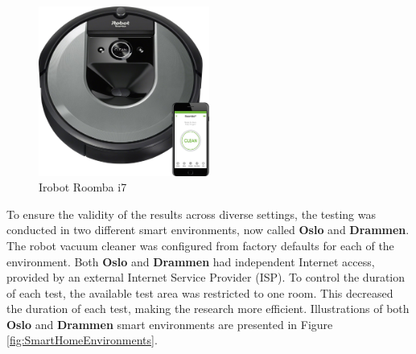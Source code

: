 \begin{figure}[H]
    \centering
    \includegraphics[width=0.5\textwidth]{figures/Irobot_picture.png}
    \caption{Irobot Roomba i7 \cite{irobotroombai7_picture}}
    \label{fig:irobotroombai7}
\end{figure}

To ensure the validity of the results across diverse settings, the testing was conducted in two different smart environments, now called \textbf{Oslo} and \textbf{Drammen}. The robot vacuum cleaner was configured from factory defaults for each of the environment. Both \textbf{Oslo} and \textbf{Drammen} had independent Internet access, provided by an external Internet Service Provider (ISP). To control the duration of each test, the available test area was restricted to one room. This decreased the duration of each test, making the research more efficient. Illustrations of both \textbf{Oslo} and \textbf{Drammen} smart environments are presented in Figure \ref{fig:SmartHomeEnvironments}.

